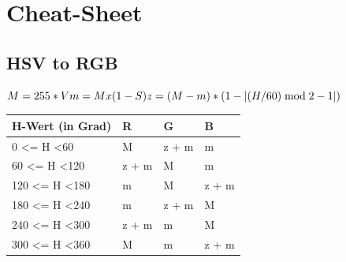 \clearpage
\section{Cheat-Sheet}
\subsection{HSV to RGB}

\(
M = 255 * V\\
m = M x (1-S)\\
z = (M - m) * (1 - |(H/60) \bmod 2 - 1|)
\)

\begin{table}[!ht]
\begin{tabular}{| l | l | l | l |}
 \hline
H-Wert (in Grad)      & R     & G     & B    \\  \hline
0 <= H \textless 60    & M     & z + m & m     \\
60 <= H \textless 120  & z + m & M     & m     \\
120 <= H \textless 180 & m     & M     & z + m \\
180 <= H \textless 240 & m     & z + m & M     \\
240 <= H \textless 300 & z + m & m     & M     \\
300 <= H \textless 360 & M     & m     & z + m \\
 \hline
\end{tabular}
\end{table}